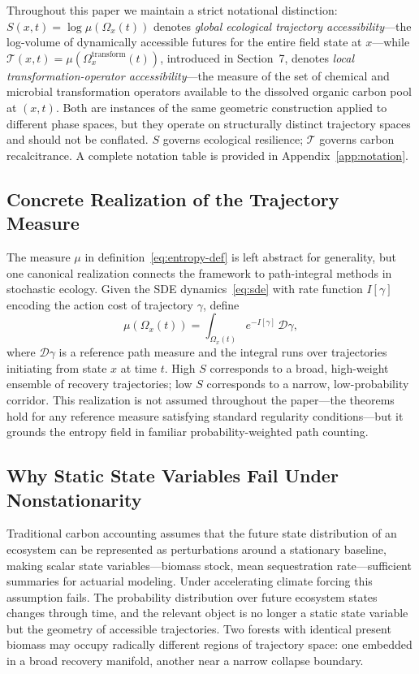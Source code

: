 \documentclass[12pt]{article}
\newcommand{\Tcal}{\mathcal{T}}
\begin{document}
Throughout this paper we maintain a strict notational distinction: $S(x,t)=\log\mu(\Omega_x(t))$
denotes \emph{global ecological trajectory accessibility}---the log-volume of dynamically
accessible futures for the entire field state at $x$---while $\Tcal(x,t)=\mu(\Omega_x^\text{transform}(t))$,
introduced in Section~7, denotes \emph{local transformation-operator accessibility}---the
measure of the set of chemical and microbial transformation operators available to the
dissolved organic carbon pool at $(x,t)$. Both are instances of the same geometric
construction applied to different phase spaces, but they operate on structurally distinct
trajectory spaces and should not be conflated. $S$ governs ecological resilience;
$\Tcal$ governs carbon recalcitrance. A complete notation table is provided in
Appendix~\ref{app:notation}.

\subsection{Concrete Realization of the Trajectory Measure}

The measure $\mu$ in definition~\eqref{eq:entropy-def} is left abstract for generality,
but one canonical realization connects the framework to path-integral methods in
stochastic ecology. Given the SDE dynamics~\eqref{eq:sde} with rate function $I[\gamma]$
encoding the action cost of trajectory $\gamma$, define
\begin{equation}
\label{eq:path-measure}
\mu(\Omega_x(t)) = \int_{\Omega_x(t)} e^{-I[\gamma]}\,\mathcal{D}\gamma,
\end{equation}
where $\mathcal{D}\gamma$ is a reference path measure and the integral runs over
trajectories initiating from state $x$ at time $t$. High $S$ corresponds to a broad,
high-weight ensemble of recovery trajectories; low $S$ corresponds to a narrow,
low-probability corridor. This realization is not assumed throughout the paper---the
theorems hold for any reference measure satisfying standard regularity conditions---but
it grounds the entropy field in familiar probability-weighted path counting.

\subsection{Why Static State Variables Fail Under Nonstationarity}

Traditional carbon accounting assumes that the future state distribution of an ecosystem
can be represented as perturbations around a stationary baseline, making scalar state
variables---biomass stock, mean sequestration rate---sufficient summaries for actuarial
modeling. Under accelerating climate forcing this assumption fails. The probability
distribution over future ecosystem states changes through time, and the relevant object
is no longer a static state variable but the geometry of accessible trajectories. Two
forests with identical present biomass may occupy radically different regions of
trajectory space: one embedded in a broad recovery manifold, another near a narrow
collapse boundary.
\end{document}
